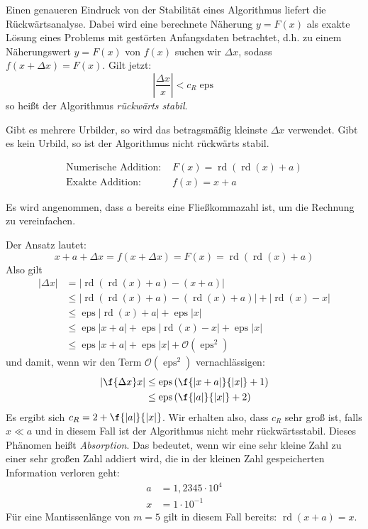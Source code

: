 \documentclass[a4paper]{scrartcl}
\numberwithin{equation}{section}
\DeclareMathOperator{\rd}{rd}
\renewcommand{\eps}{\operatorname{eps}}
\begin{document}
Einen genaueren Eindruck von der Stabilität eines Algorithmus liefert die Rückwärtsanalyse.
Dabei wird eine berechnete Näherung $y=F(x)$ als exakte Lösung eines Problems mit gestörten Anfangsdaten betrachtet,
d.h. zu einem Näherungswert $y=F(x)$ von $f(x)$ suchen wir $\Delta x$, sodass $f(x+\Delta x)=F(x)$.
Gilt jetzt:
\[
\left|\frac{\Delta x}x\right| < c_R \eps
\]
so heißt der Algorithmus \emph{rückwärts stabil}.

Gibt es mehrere Urbilder, so wird das betragsmäßig kleinste $\Delta x$ verwendet.
Gibt es kein Urbild, so ist der Algorithmus nicht rückwärts stabil.

\begin{ex}
\label{ex:2.6}
\begin{align*}
\text{Numerische Addition: } &F(x)=\rd(\rd(x)+a)\\
\text{Exakte Addition: } &f(x)=x+a
\end{align*}
\begin{note}
Es wird angenommen, dass $a$ bereits eine Fließkommazahl ist, um die Rechnung zu vereinfachen.
\end{note}
Der Ansatz lautet:
\[
	x+a+\Delta x = f(x+\Delta x) = F(x) = \rd(\rd(x)+a)
\]
Also gilt
\begin{align*}
	|\Delta x| &= |\rd(\rd(x)+a)-(x+a)|\\
				  &\le |\rd(\rd(x)+a) - (\rd(x)+a)| + |\rd(x)-x|\\
		&\le \eps|\rd(x) +a| + \eps|x|\\
		&\le \eps|x+a| + \eps|\rd(x)-x| + \eps|x|\\
		&\le \eps|x+a| + \eps|x| + \mathcal O(\eps^2)
\end{align*}
und damit, wenn wir den Term $\mathcal O(\eps^2)$ vernachlässigen:
\begin{align*}
	\left| \f{\Delta x}x\right| &\le \eps\left(\f{|x+a|}{|x|}+1\right)\\
		&\le \eps\left(\f{|a|}{|x|} + 2\right)
\end{align*}
Es ergibt sich $c_R = 2+\f{|a|}{|x|}$.
Wir erhalten also, dass $c_R$ sehr groß ist, falls $x\ll a$ und in diesem Fall ist der Algorithmus nicht mehr rückwärtsstabil.
Dieses Phänomen heißt \emph{Absorption}.
Das bedeutet, wenn wir eine sehr kleine Zahl zu einer sehr großen Zahl addiert wird, die in der kleinen Zahl gespeicherten Information verloren geht:
\begin{align*}
a&=1,2345\cdot 10^4\\
x&=1\cdot 10^{-1}
\end{align*}
Für eine Mantissenlänge von $m=5$ gilt in diesem Fall bereits: $\rd(x+a)=x$.
\end{ex}
\end{document}

